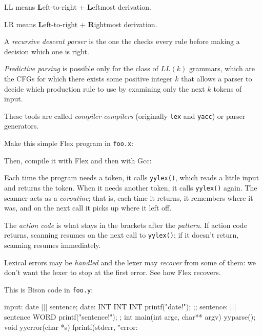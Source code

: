 \documentclass{article}
\begin{document}
LL means \textbf{L}eft-to-right + \textbf{L}eftmost derivation.

LR means \textbf{L}eft-to-right + \textbf{R}ightmost derivation.
\plush{}


A \emph{recursive descent parser} is the one the checks every rule before making a decision which one is right.

\emph{Predictive parsing} is possible only for the class of \(LL(k)\) grammars, which are the CFGs for which there exists some positive integer \(k\) that allows a parser to decide which production rule to use by examining only the next \(k\) tokens of input.
\plush{}


These tools are called \emph{compiler-compilers} (originally \texttt{lex} and \texttt{yacc}) or parser generators.

Make this simple Flex program in \texttt{foo.x}:
Then, compile it with Flex and then with Gcc:
\plush{}

Each time the program needs a token, it calls \texttt{yylex()}, which reads a little input and returns the token. When it needs another token, it calls \texttt{yylex()} again. The scanner acts as a \emph{coroutine}; that is, each time it returns, it remembers where it was, and on the next call it picks up where it left off.
\plush{}

The \emph{action code} is what stays in the brackets after the \emph{pattern}. If action code returns, scanning resumes on the next call to \texttt{yylex()}; if it doesn't return, scanning resumes immediately.
\plush{}

Lexical errors may be \emph{handled} and the lexer may \emph{recover} from some of them: we don't want the lexer to stop at the first error. See how Flex recovers.
\plush{}

This is Bison code in \texttt{foo.y}:
\begin{ffcode}
input: date |$\vert$| sentence;
date:
  INT INT INT
  { printf("date!\n"); };;
sentence:
  |$\vert$|
  sentence WORD
  { printf("sentence!\n"); };
int main(int argc, char** argv) {
  yyparse();
}
void yyerror(char *s) {
  fprintf(stderr, "error: %
}
\end{ffcode}
\plush{}
\end{document}
